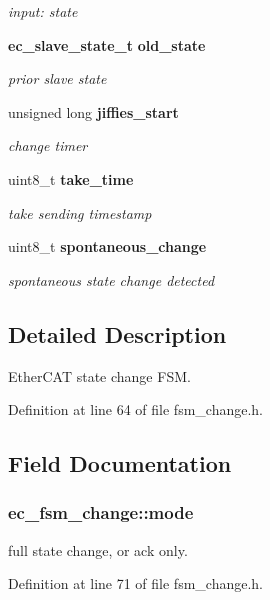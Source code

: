 \begin{DoxyCompactItemize}
\begin{DoxyCompactList}\small\item\em input\-: state \end{DoxyCompactList}\item 
{\bf ec\-\_\-slave\-\_\-state\-\_\-t} {\bf old\-\_\-state}\label{structec__fsm__change_a1327ecfcea3bdd858423750cf22783e6}

\begin{DoxyCompactList}\small\item\em prior slave state \end{DoxyCompactList}\item 
unsigned long {\bf jiffies\-\_\-start}\label{structec__fsm__change_aa357cf0cae0e5b306b6f555d48dc47ba}

\begin{DoxyCompactList}\small\item\em change timer \end{DoxyCompactList}\item 
uint8\-\_\-t {\bf take\-\_\-time}\label{structec__fsm__change_a86dd65308e2a0e1c89a96f35d2b5672f}

\begin{DoxyCompactList}\small\item\em take sending timestamp \end{DoxyCompactList}\item 
uint8\-\_\-t {\bf spontaneous\-\_\-change}\label{structec__fsm__change_a67f934c317235fc5ea71ee128f6a979b}

\begin{DoxyCompactList}\small\item\em spontaneous state change detected \end{DoxyCompactList}\end{DoxyCompactItemize}


\subsection{\-Detailed \-Description}
\-Ether\-C\-A\-T state change \-F\-S\-M. 

\-Definition at line 64 of file fsm\-\_\-change.\-h.



\subsection{\-Field \-Documentation}
\subsubsection[{mode}]{ {\bf ec\-\_\-fsm\-\_\-change\-::mode}}\label{structec__fsm__change_a3565fb9fec03a24d1d3a66cce7e9fce3}


full state change, or ack only. 



\-Definition at line 71 of file fsm\-\_\-change.\-h.

